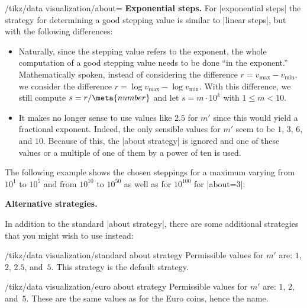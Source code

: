 \begin{key}{/tikz/data visualization/about=}
  \medskip
  \textbf{Exponential steps.}
  For |exponential steps| the strategy for determining a good stepping
  value is similar to |linear steps|, but with the following
  differences:
  \begin{itemize}
  \item Naturally, since the stepping value refers to the exponent,
    the whole computation of a good stepping value needs to be done
    ``in the exponent.'' Mathematically spoken, instead of considering
    the difference $r = v_{\max} - v_{\min}$, we consider the difference $r =
    \log v_{\max} - \log v_{\min}$. With this difference, we still
    compute $s = r / \meta{number}$ and let $s = m \cdot 10^k$ with $1
    \le m < 10$.
  \item It makes no longer sense to use values like $2.5$ for $m'$
    since this would yield a fractional exponent. Indeed, the only
    sensible values for $m'$ seem to be $1$, $3$, $6$, and
    $10$. Because of this, the |about strategy| is ignored and one of
    these values or a multiple of one of them by a power of ten is
    used.
  \end{itemize}

  The following example shows the chosen steppings for a maximum
  varying from $10^1$ to $10^5$ and from $10^{10}$ to $10^{50}$ as
  well as for $10^{100}$ for |about=3|:

  \medskip


  \medskip
  \textbf{Alternative strategies.}

  In addition to the standard |about strategy|, there are some
  additional strategies that you might wish to use instead:

  \begin{key}{/tikz/data visualization/standard about
      strategy}
    Permissible values for $m'$ are: $1$, $2$, $2.5$, and~$5$. This
    strategy is the default strategy.
  \end{key}

  \begin{key}{/tikz/data visualization/euro about strategy}
    Permissible values for $m'$ are: $1$, $2$, and~$5$. These are the
    same values as for the Euro coins, hence the
    name.


\end{key}
\end{key}
